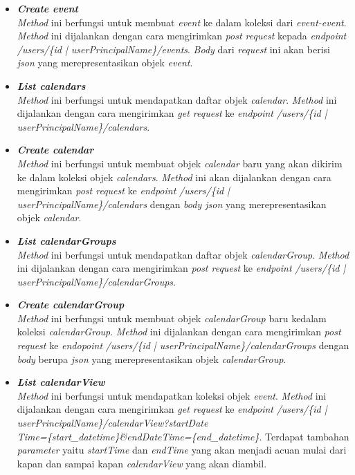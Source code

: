 \begin{itemize}
	\item \textbf{\textit{Create event}}\\
	\textit{Method} ini berfungsi untuk membuat \textit{event} ke dalam koleksi dari \textit{event-event}. \textit{Method} ini dijalankan dengan cara mengirimkan \textit{post request} kepada \textit{endpoint} \textit{/users/\{id | userPrincipalName\}/events}. \textit{Body} dari \textit{request} ini akan berisi \textit{json} yang merepresentasikan objek \textit{event}.
	\item \textbf{\textit{List calendars}}\\
	\textit{Method} ini berfungsi untuk mendapatkan daftar objek \textit{calendar}. \textit{Method} ini dijalankan dengan cara mengirimkan \textit{get request} ke \textit{endpoint} \textit{/users/\{id | userPrincipalName\}/calendars}. 
	\item \textbf{\textit{Create calendar}}\\
	\textit{Method} ini berfungsi untuk membuat objek \textit{calendar} baru yang akan dikirim ke dalam koleksi objek \textit{calendars}. \textit{Method} ini akan dijalankan dengan cara mengirimkan \textit{post request} ke \textit{endpoint} \textit{/users/\{id | userPrincipalName\}/calendars} dengan \textit{body json} yang merepresentasikan objek \textit{calendar}.
	\item \textbf{\textit{List calendarGroups}}\\
	\textit{Method} ini berfungsi untuk mendapatkan daftar objek \textit{calendarGroup}. \textit{Method} ini dijalankan dengan cara mengirimkan \textit{post request} ke \textit{endpoint} \textit{/users/\{id | userPrincipalName\}/calendarGroups}.                           
	\item \textbf{\textit{Create calendarGroup}}\\
	\textit{Method} ini berfungsi untuk membuat objek \textit{calendarGroup} baru kedalam koleksi \textit{calendarGroup}. \textit{Method} ini dijalankan dengan cara mengirimkan \textit{post request} ke \textit{endopoint} \textit{/users/\{id | userPrincipalName\}/calendarGroups} dengan \textit{body} berupa \textit{json} yang merepresentasikan objek \textit{calendarGroup}.
	\item \textbf{\textit{List calendarView}}\\
	\textit{Method} ini berfungsi untuk mendapatkan koleksi objek \textit{event}. \textit{Method} ini dijalankan dengan cara mengirimkan \textit{get request} ke \textit{endpoint} \textit{/users/\{id | userPrincipalName\}/calendarView?startDate\\Time=\{start\_datetime\}\&endDateTime=\{end\_datetime\}}. Terdapat tambahan \textit{parameter} yaitu \textit{startTime} dan \textit{endTime} yang akan menjadi acuan mulai dari kapan dan sampai kapan \textit{calendarView} yang akan diambil. 

\end{itemize}
